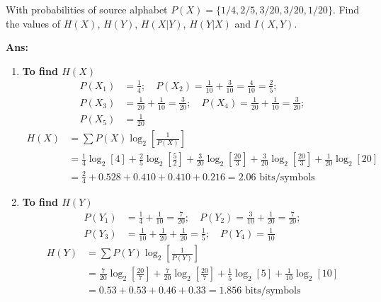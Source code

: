 \documentclass[12pt]{article}
\begin{document}
With probabilities of source alphabet $P(X) = \{1/4, 2/5, 3/20, 3/20, 1/20\}$. Find the values of $H(X)$, $H(Y)$, $H(X|Y)$, $H(Y|X)$ and $I(X,Y)$.

\textbf{Ans:}
\begin{enumerate}
	\item[i.] \textbf{To find $H(X)$}
	      \begin{align*}
		      P(X_1) & = \frac{1}{4}; \quad P(X_2) = \frac{1}{10} + \frac{3}{10} = \frac{4}{10} = \frac{2}{5};                  \\
		      P(X_3) & = \frac{1}{20} + \frac{1}{10} = \frac{3}{20}; \quad P(X_4) = \frac{1}{20} + \frac{1}{10} = \frac{3}{20}; \\
		      P(X_5) & = \frac{1}{20}
	      \end{align*}
	      \begin{align*}
		      H(X) & = \sum P(X) \log_2 \left[ \frac{1}{P(X)} \right]                                                                                                                                        \\
		           & = \frac{1}{4}\log_2[4] + \frac{2}{5}\log_2\left[\frac{5}{2}\right] + \frac{3}{20}\log_2\left[\frac{20}{3}\right] + \frac{3}{20}\log_2\left[\frac{20}{3}\right] + \frac{1}{20}\log_2[20] \\
		           & = \frac{2}{4} + 0.528 + 0.410 + 0.410 + 0.216 = 2.06 \text{ bits/symbols}
	      \end{align*}

	\item[ii.] \textbf{To find $H(Y)$}
	      \begin{align*}
		      P(Y_1) & = \frac{1}{4} + \frac{1}{10} = \frac{7}{20}; \quad P(Y_2) = \frac{3}{10} + \frac{1}{20} = \frac{7}{20}; \\
		      P(Y_3) & = \frac{1}{10} + \frac{1}{20} + \frac{1}{20} = \frac{1}{5}; \quad P(Y_4) = \frac{1}{10}
	      \end{align*}
	      \begin{align*}
		      H(Y) & = \sum P(Y) \log_2 \left[ \frac{1}{P(Y)} \right]                                                                                            \\
		           & = \frac{7}{20}\log_2\left[\frac{20}{7}\right] + \frac{7}{20}\log_2\left[\frac{20}{7}\right] + \frac{1}{5}\log_2[5] + \frac{1}{10}\log_2[10] \\
		           & = 0.53 + 0.53 + 0.46 + 0.33 = 1.856 \text{ bits/symbols}
	      \end{align*}


\end{enumerate}
\end{document}
